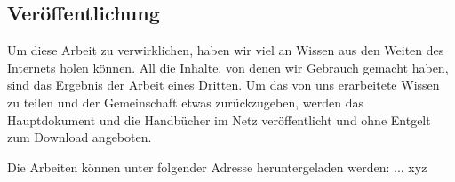 \subsection{Veröffentlichung}
Um diese Arbeit zu verwirklichen, haben wir viel an Wissen aus den Weiten des Internets holen können. All die Inhalte, von denen wir Gebrauch gemacht haben, sind das Ergebnis der Arbeit eines Dritten. Um das von uns erarbeitete Wissen zu teilen und der Gemeinschaft etwas zurückzugeben, werden das Hauptdokument und die Handbücher im Netz veröffentlicht und ohne Entgelt zum Download angeboten.

Die Arbeiten können unter folgender Adresse heruntergeladen werden: ... xyz
